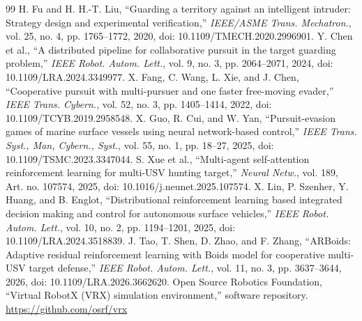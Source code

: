 \documentclass[journal]{IEEEtran}
\begin{document}
\begin{thebibliography}{99}
 H. Fu and H. H.-T. Liu, ``Guarding a territory against an intelligent intruder: Strategy design and experimental verification,'' \emph{IEEE/ASME Trans. Mechatron.}, vol. 25, no. 4, pp. 1765--1772, 2020, doi: 10.1109/TMECH.2020.2996901.
 Y. Chen et al., ``A distributed pipeline for collaborative pursuit in the target guarding problem,'' \emph{IEEE Robot. Autom. Lett.}, vol. 9, no. 3, pp. 2064--2071, 2024, doi: 10.1109/LRA.2024.3349977.
 X. Fang, C. Wang, L. Xie, and J. Chen, ``Cooperative pursuit with multi-pursuer and one faster free-moving evader,'' \emph{IEEE Trans. Cybern.}, vol. 52, no. 3, pp. 1405--1414, 2022, doi: 10.1109/TCYB.2019.2958548.
 X. Guo, R. Cui, and W. Yan, ``Pursuit-evasion games of marine surface vessels using neural network-based control,'' \emph{IEEE Trans. Syst., Man, Cybern., Syst.}, vol. 55, no. 1, pp. 18--27, 2025, doi: 10.1109/TSMC.2023.3347044.
 S. Xue et al., ``Multi-agent self-attention reinforcement learning for multi-USV hunting target,'' \emph{Neural Netw.}, vol. 189, Art. no. 107574, 2025, doi: 10.1016/j.neunet.2025.107574.
 X. Lin, P. Szenher, Y. Huang, and B. Englot, ``Distributional reinforcement learning based integrated decision making and control for autonomous surface vehicles,'' \emph{IEEE Robot. Autom. Lett.}, vol. 10, no. 2, pp. 1194--1201, 2025, doi: 10.1109/LRA.2024.3518839.
 J. Tao, T. Shen, D. Zhao, and F. Zhang, ``ARBoids: Adaptive residual reinforcement learning with Boids model for cooperative multi-USV target defense,'' \emph{IEEE Robot. Autom. Lett.}, vol. 11, no. 3, pp. 3637--3644, 2026, doi: 10.1109/LRA.2026.3662620.
 Open Source Robotics Foundation, ``Virtual RobotX (VRX) simulation environment,'' software repository. \url{https://github.com/osrf/vrx}
\end{thebibliography}
\end{document}
